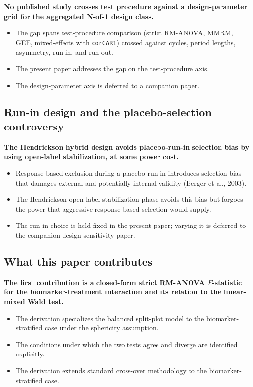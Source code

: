 \documentclass[
  11pt,
]{article}
\begin{document}
\textbf{No published study crosses test procedure against a design-parameter grid for the aggregated N-of-1 design class.}

\begin{itemize}\setlength{\itemsep}{2pt}\setlength{\parskip}{0pt}
\item The gap spans test-procedure comparison (strict RM-ANOVA, MMRM, GEE, mixed-effects with \texttt{corCAR1}) crossed against cycles, period lengths, asymmetry, run-in, and run-out.
\item The present paper addresses the gap on the test-procedure axis.
\item The design-parameter axis is deferred to a companion paper.
\end{itemize}

\subsection{Run-in design and the placebo-selection controversy}\label{run-in-design-and-the-placebo-selection-controversy}

\textbf{The Hendrickson hybrid design avoids placebo-run-in selection bias by using open-label stabilization, at some power cost.}

\begin{itemize}\setlength{\itemsep}{2pt}\setlength{\parskip}{0pt}
\item Response-based exclusion during a placebo run-in introduces selection bias that damages external and potentially internal validity (Berger et al., 2003).
\item The Hendrickson open-label stabilization phase avoids this bias but forgoes the power that aggressive response-based selection would supply.
\item The run-in choice is held fixed in the present paper; varying it is deferred to the companion design-sensitivity paper.
\end{itemize}

\subsection{What this paper contributes}\label{what-this-paper-contributes}

\textbf{The first contribution is a closed-form strict RM-ANOVA $F$-statistic for the biomarker-treatment interaction and its relation to the linear-mixed Wald test.}

\begin{itemize}\setlength{\itemsep}{2pt}\setlength{\parskip}{0pt}
\item The derivation specializes the balanced split-plot model to the biomarker-stratified case under the sphericity assumption.
\item The conditions under which the two tests agree and diverge are identified explicitly.
\item The derivation extends standard cross-over methodology to the biomarker-stratified case.
\end{itemize}
\end{document}
